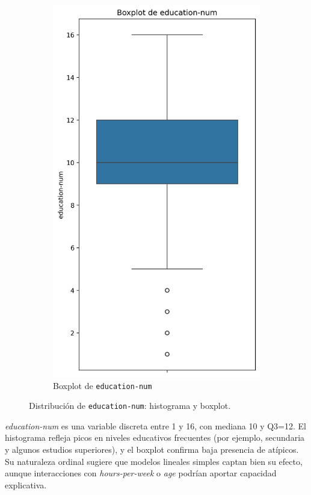 \documentclass[12pt,a4paper]{article}
\begin{document}
\begin{enumerate}
\begin{figure}[H]
\begin{subfigure}[b]{0.45\textwidth}
        \includegraphics[width=\textwidth]{boxplot_education-num.png}
        \caption{Boxplot de \texttt{education-num}}
        \label{fig:education_num_boxplot}
      \end{subfigure}
      \caption{Distribución de \texttt{education-num}: histograma y boxplot.}
      \label{fig:education_num_visual}
    \end{figure}

    \emph{education-num} es una variable discreta entre 1 y 16, con mediana 10 y Q3=12. El histograma refleja picos en niveles 
    educativos frecuentes (por ejemplo, secundaria y algunos estudios superiores), y el boxplot confirma baja presencia de atípicos. 
    Su naturaleza ordinal sugiere que modelos lineales simples captan bien su efecto, aunque interacciones con \emph{hours-per-week} o 
    \emph{age} podrían aportar capacidad explicativa.


\end{enumerate}
\end{document}

